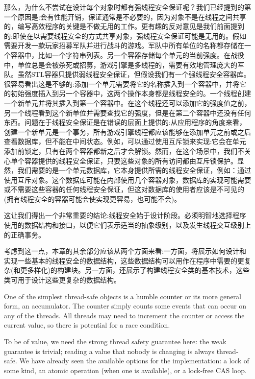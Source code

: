 那么，为什么不尝试在设计每个对象时都有强线程安全保证呢？我们已经提到的第一个原因是:会有性能开销，保证通常是不必要的，因为对象不是在线程之间共享的，编写高效程序的关键是不做无用的工作。更有趣的反对意见是我们前面提到的:即使在以需要线程安全的方式共享对象，强线程安全保证可能是无用的。假如需要开发一款玩家招募军队并进行战斗的游戏。军队中所有单位的名称都存储在一个容器中，比如一个字符串列表。另一个容器存储每个单元的当前强度。在战役中，单位总是会被杀死或招募，游戏引擎是多线程的，需要有效地管理庞大的军队。虽然STL容器只提供弱线程安全保证，但假设我们有一个强线程安全容器库。很容易看出这是不够的:添加一个单元需要将它的名称插入到一个容器中，并将它的初始强度插入到另一个容器中，这两个操作本身都是线程安全的。一个线程创建一个新单元并将其插入到第一个容器中。在这个线程还可以添加它的强度值之前，另一个线程看到这个新单位并需要查找它的强度，但是在第二个容器中还没有任何东西。问题在于线程安全保证是在错误的层面上提供的:从应用程序的角度来看，创建一个新单元是一个事务，所有游戏引擎线程都应该能够在添加单元之前或之后查看数据库，但不能在中间状态。例如，可以通过使用互斥锁来实现:它会在单元添加前锁定，只有在两个容器都新之后才会解锁。然而，在这个场景中，我们不关心单个容器提供的线程安全保证，只要这些对象的所有访问都由互斥锁保护。显然，我们需要的是一个单元数据库，它本身提供所需的线程安全保证，例如：通过使用互斥对象。这个数据库可能在内部使用几个容器对象，数据库的实现可能需要或不需要这些容器的任何线程安全保证，但这对数据库的使用者应该是不可见的(拥有线程安全的容器可能会使实现更容易，也可能不会)。

这让我们得出一个非常重要的结论:线程安全始于设计阶段。必须明智地选择程序使用的数据结构和接口，以便它们表示适当的抽象级别，以及发生线程交互级别上的正确事务。

考虑到这一点，本章的其余部分应该从两个方面来看:一方面，将展示如何设计和实现一些基本的线程安全的数据结构，这些数据结构可以用作在程序中需要的更复杂(和更多样化)的构建块。另一方面，还展示了构建线程安全类的基本技术，这些类可用于设计这些更复杂的数据结构。


One of the simplest thread-safe objects is a humble counter or its more general form, an accumulator. The counter simply counts some events that can occur on any of the threads. All threads may need to increment the counter or access the current value, so there is potential for a race condition. 

To be of value, we need the strong thread safety guarantee here: the weak guarantee is trivial; reading a value that nobody is changing is always thread-safe. We have already seen the available options for the implementation: a lock of some kind, an atomic operation (when one is available), or a lock-free CAS loop.

